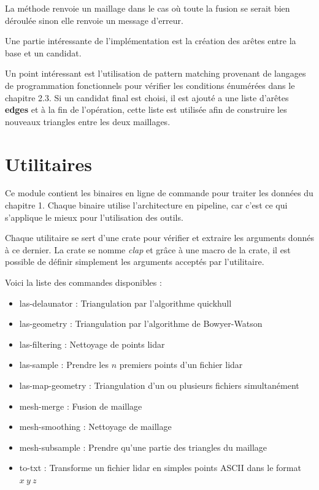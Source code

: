 La méthode renvoie un maillage dans le cas où toute la fusion se serait bien déroulée sinon elle renvoie un message d'erreur.

Une partie intéressante de l'implémentation est la création des arêtes entre la base et un candidat.


Un point intéressant est l'utilisation de pattern matching provenant de langages de programmation fonctionnels pour vérifier les conditions énumérées dans le chapitre 2.3. Si un candidat final est choisi, il est ajouté a une liste d'arêtes \textbf{edges} et à la fin de l'opération, cette liste est utilisée afin de construire les nouveaux triangles entre les deux maillages.

\section{Utilitaires}

Ce module contient les binaires en ligne de commande pour traiter les données du
chapitre 1.
Chaque binaire utilise l'architecture en pipeline, car c'est ce qui s'applique le
mieux pour l'utilisation des outils.

Chaque utilitaire se sert d'une crate pour vérifier et extraire les arguments
donnés à ce dernier. La crate se nomme \textit{clap} et grâce à une macro de la
crate, il est possible de définir simplement les arguments acceptés par 
l'utilitaire.

Voici la liste des commandes disponibles :
\begin{itemize}
	\item las-delaunator : Triangulation par l'algorithme quickhull
	\item las-geometry : Triangulation par l'algorithme de Bowyer-Watson
	\item las-filtering : Nettoyage de points lidar
	\item las-sample : Prendre les $n$ premiers points d'un fichier lidar
	\item las-map-geometry : Triangulation d'un ou plusieurs fichiers
		simultanément
	\item mesh-merge : Fusion de maillage
	\item mesh-smoothing : Nettoyage de maillage
	\item mesh-subsample : Prendre qu'une partie des triangles du maillage
	\item to-txt : Transforme un fichier lidar en simples points ASCII dans le
		format $x\ y\ z$
\end{itemize}

